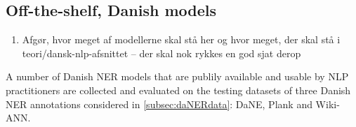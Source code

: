 \documentclass[main.tex]{subfiles}
\begin{document}
\subsection{Off-the-shelf, Danish models}
\begin{enumerate}
    \item Afgør, hvor meget af modellerne skal stå her og hvor meget, der skal stå i teori/dansk-nlp-afsnittet -- der skal nok rykkes en god sjat derop
\end{enumerate}
\label{sec:exidan}
A number of Danish NER models that are publily available and usable by NLP practitioners are collected and evaluated on the testing datasets of three Danish NER annotations considered in \ref{subsec:daNERdata}: DaNE, Plank and Wiki-ANN.
\end{document}
